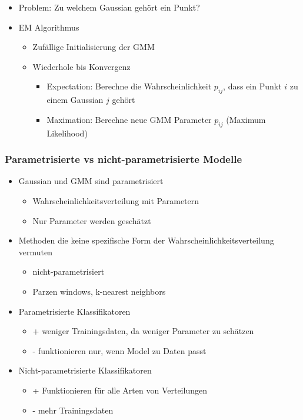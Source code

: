 \documentclass[paper=a4, fontsize=11pt]{scrartcl} %
\numberwithin{equation}{section} %
\numberwithin{figure}{section} %
\numberwithin{table}{section} %
\begin{document}
\begin{itemize}
\item Problem: Zu welchem Gaussian gehört ein Punkt?
\item EM Algorithmus
\begin{itemize}
\item Zufällige Initialisierung der GMM
\item Wiederhole bis Konvergenz
\begin{itemize}
\item Expectation: Berechne die Wahrscheinlichkeit $p_{ij}$, dass ein Punkt $i$ zu einem Gaussian $j$ gehört
\item Maximation: Berechne neue GMM Parameter $p_{ij}$ (Maximum Likelihood)
\end{itemize}
\end{itemize}
\end{itemize}

\subsubsection{Parametrisierte vs nicht-parametrisierte Modelle}

\begin{itemize}
\item Gaussian und GMM sind parametrisiert
\begin{itemize}
\item Wahrscheinlichkeitsverteilung mit Parametern
\item Nur Parameter werden geschätzt
\end{itemize}
\item Methoden die keine spezifische Form der Wahrscheinlichkeitsverteilung vermuten
\begin{itemize}
\item nicht-parametrisiert
\item Parzen windows, k-nearest neighbors
\end{itemize}
\item Parametrisierte Klassifikatoren
\begin{itemize}
\item + weniger Trainingsdaten, da weniger Parameter zu schätzen
\item - funktionieren nur, wenn Model zu Daten passt
\end{itemize}
\item Nicht-parametrisierte Klassifikatoren
\begin{itemize}
\item + Funktionieren für alle Arten von Verteilungen
\item - mehr Trainingsdaten
\end{itemize}
\end{itemize}
\end{document}

